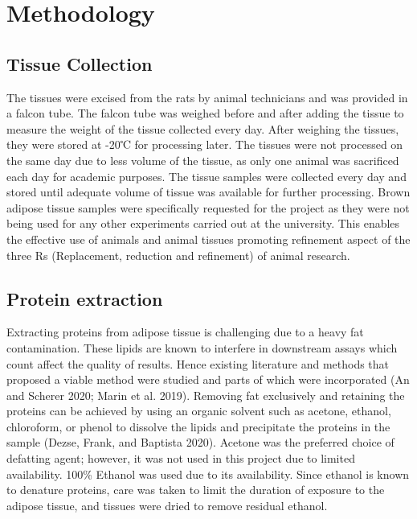 \documentclass[
  letterpaper,
  DIV=11,
  numbers=noendperiod]{scrreprt}
\begin{document}
\section{Methodology}\label{methodology}

\subsection{\texorpdfstring{\textbf{Tissue
Collection}}{Tissue Collection}}\label{tissue-collection}

The tissues were excised from the rats by animal technicians and was
provided in a falcon tube. The falcon tube was weighed before and after
adding the tissue to measure the weight of the tissue collected every
day. After weighing the tissues, they were stored at -20℃ for processing
later. The tissues were not processed on the same day due to less volume
of the tissue, as only one animal was sacrificed each day for academic
purposes. The tissue samples were collected every day and stored until
adequate volume of tissue was available for further processing. Brown
adipose tissue samples were specifically requested for the project as
they were not being used for any other experiments carried out at the
university. This enables the effective use of animals and animal tissues
promoting refinement aspect of the three Rs (Replacement, reduction and
refinement) of animal research.

\subsection{\texorpdfstring{\textbf{Protein
extraction}}{Protein extraction}}\label{protein-extraction}

Extracting proteins from adipose tissue is challenging due to a heavy
fat contamination. These lipids are known to interfere in downstream
assays which count affect the quality of results. Hence existing
literature and methods that proposed a viable method were studied and
parts of which were incorporated (An and Scherer 2020; Marin et al.
2019). Removing fat exclusively and retaining the proteins can be
achieved by using an organic solvent such as acetone, ethanol,
chloroform, or phenol to dissolve the lipids and precipitate the
proteins in the sample (Dezse, Frank, and Baptista 2020). Acetone was
the preferred choice of defatting agent; however, it was not used in
this project due to limited availability. 100\% Ethanol was used due to
its availability. Since ethanol is known to denature proteins, care was
taken to limit the duration of exposure to the adipose tissue, and
tissues were dried to remove residual ethanol.
\end{document}
